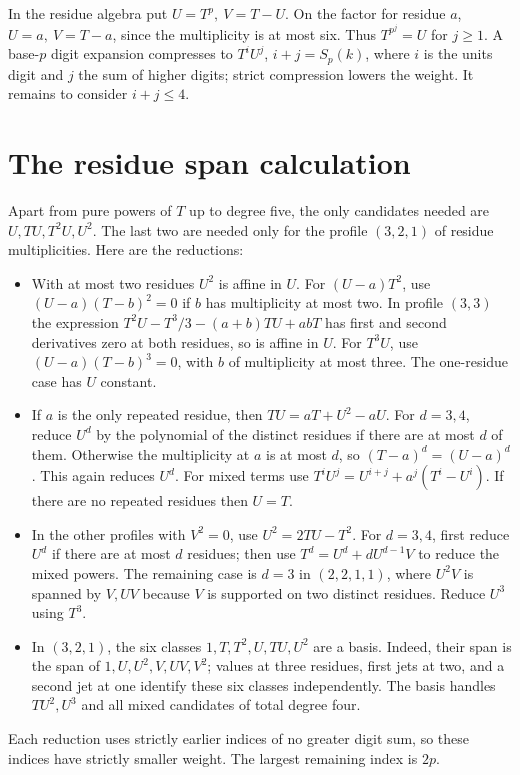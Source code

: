 \documentclass[11pt]{article}
\begin{document}
In the residue algebra put \(U=T^p,\ V=T-U\). On the factor for
residue \(a\), \(U=a,\ V=T-a\), since the multiplicity is at most
six. Thus \(T^{p^j}=U\) for \(j\ge1\). A base-\(p\) digit expansion
compresses to \(T^iU^j\), \(i+j=S_p(k)\), where \(i\) is the units
digit and \(j\) the sum of higher digits; strict compression lowers
the weight. It remains to consider \(i+j\le4\).
\newpage
\section{The residue span calculation}
Apart from pure powers of \(T\) up to degree five, the only candidates
needed are \(U,TU,T^2U,U^2\). The last two are needed only for the
profile \((3,2,1)\) of residue multiplicities. Here are the reductions:
\begin{itemize}
\item With at most two residues \(U^2\) is affine in \(U\).
For \((U-a)T^2\), use \((U-a)(T-b)^2=0\) if \(b\)
has multiplicity at most two. In profile \((3,3)\) the expression
\(T^2U-T^3/3-(a+b)TU+abT\) has first and second derivatives zero
at both residues, so is affine in \(U\). For \(T^3U\), use
\((U-a)(T-b)^3=0\), with \(b\) of multiplicity at most three.
The one-residue case has \(U\) constant.
\item If \(a\) is the only repeated residue, then
\(TU=aT+U^2-aU\). For \(d=3,4\), reduce \(U^d\) by the polynomial
of the distinct residues if there are at most \(d\) of them.
Otherwise the multiplicity at \(a\) is at most \(d\), so
\((T-a)^d=(U-a)^d\). This again reduces \(U^d\).
For mixed terms use \(T^iU^j=U^{i+j}+a^j(T^i-U^i)\).
If there are no repeated residues then \(U=T\).
\item In the other profiles with \(V^2=0\), use \(U^2=2TU-T^2\).
For \(d=3,4\), first reduce \(U^d\) if there are at most \(d\)
residues; then use \(T^d=U^d+dU^{d-1}V\) to reduce the mixed powers.
The remaining case is \(d=3\) in \((2,2,1,1)\), where \(U^2V\)
is spanned by \(V,UV\) because \(V\) is supported on two distinct
residues. Reduce \(U^3\) using \(T^3\).
\item In \((3,2,1)\), the six classes \(1,T,T^2,U,TU,U^2\)
are a basis. Indeed, their span is the span of \(1,U,U^2,\allowbreak V,UV,V^2\);
values at three residues, first jets at two, and a second jet at
one identify these six classes independently. The basis handles
\(TU^2,U^3\) and all mixed candidates of total degree four.
\end{itemize}
Each reduction uses strictly earlier indices of no greater digit
sum, so these indices have strictly smaller weight.
The largest remaining index is \(2p\).
\end{document}
